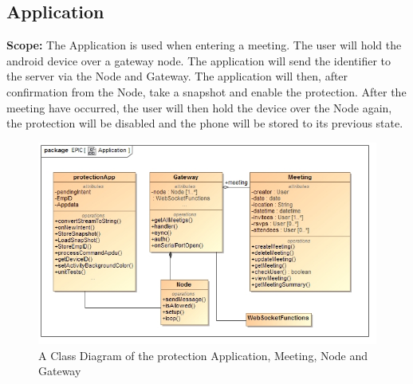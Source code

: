 \documentclass{article}
\begin{document}
\newpage
		\subsection{Application}
			\textbf{Scope: }The Application is used when entering a meeting. The user will hold the android device over a gateway node. The application will send the identifier to the server via the Node and Gateway. The application will then, after confirmation from the Node, take a snapshot and enable the protection. After the meeting have occurred, the user will then hold the device over the Node again, the protection will be disabled and the phone will be stored to its previous state. 
		
		\begin{figure}[H]
 			 \centering
			  \includegraphics[width=12cm]{ApplicationClass}
		 	 \caption{A Class Diagram of the protection Application, Meeting, Node and Gateway}
		\end{figure}
\end{document}
